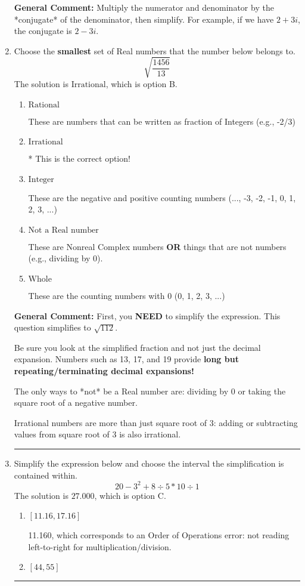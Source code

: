 \documentclass{extbook}[14pt]
\newcommand{\litem}[1]{\item #1

\rule{\textwidth}{0.4pt}}
\begin{document}
\begin{enumerate}
{\textbf{General Comment:} Multiply the numerator and denominator by the *conjugate* of the denominator, then simplify. For example, if we have $2+3i$, the conjugate is $2-3i$.
}
\litem{
Choose the \textbf{smallest} set of Real numbers that the number below belongs to.
\[ \sqrt{\frac{1456}{13}} \]The solution is \( \text{Irrational} \), which is option B.\begin{enumerate}[label=\Alph*.]
\item \( \text{Rational} \)

These are numbers that can be written as fraction of Integers (e.g., -2/3)
\item \( \text{Irrational} \)

* This is the correct option!
\item \( \text{Integer} \)

These are the negative and positive counting numbers (..., -3, -2, -1, 0, 1, 2, 3, ...)
\item \( \text{Not a Real number} \)

These are Nonreal Complex numbers \textbf{OR} things that are not numbers (e.g., dividing by 0).
\item \( \text{Whole} \)

These are the counting numbers with 0 (0, 1, 2, 3, ...)
\end{enumerate}

\textbf{General Comment:} First, you \textbf{NEED} to simplify the expression. This question simplifies to $\sqrt{112}$. 
 
 Be sure you look at the simplified fraction and not just the decimal expansion. Numbers such as 13, 17, and 19 provide \textbf{long but repeating/terminating decimal expansions!} 
 
 The only ways to *not* be a Real number are: dividing by 0 or taking the square root of a negative number. 
 
 Irrational numbers are more than just square root of 3: adding or subtracting values from square root of 3 is also irrational.
}
\litem{
Simplify the expression below and choose the interval the simplification is contained within.
\[ 20 - 3^2 + 8 \div 5 * 10 \div 1 \]The solution is \( 27.000 \), which is option C.\begin{enumerate}[label=\Alph*.]
\item \( [11.16, 17.16] \)

 11.160, which corresponds to an Order of Operations error: not reading left-to-right for multiplication/division.
\item \( [44, 55] \)


\end{enumerate}}
\end{enumerate}
\end{document}
